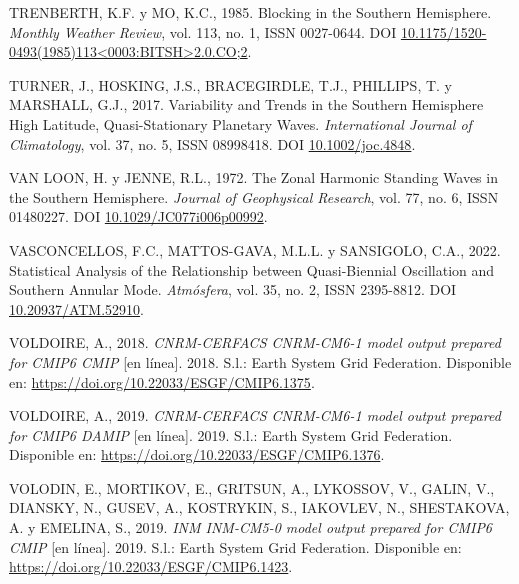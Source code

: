\documentclass[12pt,oneside,a4paper]{reedthesis}
\newlength{\cslhangindent}
\newenvironment{CSLReferences}[2] %
 {%
  \setlength{\parindent}{0pt}
  \ifodd #1 \everypar{\setlength{\hangindent}{\cslhangindent}}\ignorespaces\fi
  \ifnum #2 > 0
  \setlength{\parskip}{#2\baselineskip}
  \fi
 }%
 {}
\begin{document}
\begin{CSLReferences}{1}{0}
\leavevmode{}%
TRENBERTH, K.F. y MO, K.C., 1985. Blocking in the {Southern Hemisphere}. \emph{Monthly Weather Review}, vol. 113, no. 1, ISSN 0027-0644. DOI \href{https://doi.org/10.1175/1520-0493(1985)113\%3C0003:BITSH\%3E2.0.CO;2}{10.1175/1520-0493(1985)113\textless0003:BITSH\textgreater2.0.CO;2}.

\leavevmode{}%
TURNER, J., HOSKING, J.S., BRACEGIRDLE, T.J., PHILLIPS, T. y MARSHALL, G.J., 2017. Variability and Trends in the {Southern Hemisphere} High Latitude, Quasi-Stationary Planetary Waves. \emph{International Journal of Climatology}, vol. 37, no. 5, ISSN 08998418. DOI \href{https://doi.org/10.1002/joc.4848}{10.1002/joc.4848}.

\leavevmode{}%
VAN LOON, H. y JENNE, R.L., 1972. The Zonal Harmonic Standing Waves in the Southern Hemisphere. \emph{Journal of Geophysical Research}, vol. 77, no. 6, ISSN 01480227. DOI \href{https://doi.org/10.1029/JC077i006p00992}{10.1029/JC077i006p00992}.

\leavevmode{}%
VASCONCELLOS, F.C., MATTOS-GAVA, M.L.L. y SANSIGOLO, C.A., 2022. Statistical Analysis of the Relationship between {Quasi-Biennial Oscillation} and {Southern Annular Mode}. \emph{Atm{ó}sfera}, vol. 35, no. 2, ISSN 2395-8812. DOI \href{https://doi.org/10.20937/ATM.52910}{10.20937/ATM.52910}.

\leavevmode{}%
VOLDOIRE, A., 2018. \emph{CNRM-CERFACS CNRM-CM6-1 model output prepared for CMIP6 CMIP} {[}en línea{]}. 2018. S.l.: Earth System Grid Federation. Disponible en: \url{https://doi.org/10.22033/ESGF/CMIP6.1375}.

\leavevmode{}%
VOLDOIRE, A., 2019. \emph{CNRM-CERFACS CNRM-CM6-1 model output prepared for CMIP6 DAMIP} {[}en línea{]}. 2019. S.l.: Earth System Grid Federation. Disponible en: \url{https://doi.org/10.22033/ESGF/CMIP6.1376}.

\leavevmode{}%
VOLODIN, E., MORTIKOV, E., GRITSUN, A., LYKOSSOV, V., GALIN, V., DIANSKY, N., GUSEV, A., KOSTRYKIN, S., IAKOVLEV, N., SHESTAKOVA, A. y EMELINA, S., 2019. \emph{INM INM-CM5-0 model output prepared for CMIP6 CMIP} {[}en línea{]}. 2019. S.l.: Earth System Grid Federation. Disponible en: \url{https://doi.org/10.22033/ESGF/CMIP6.1423}.


\end{CSLReferences}
\end{document}
